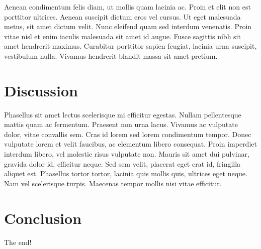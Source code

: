 \documentclass[11pt,twocolumn]{article} %
\begin{document}
Aenean condimentum felis diam, ut mollis quam lacinia ac. Proin et elit non est porttitor ultrices. Aenean suscipit dictum eros vel cursus. Ut eget malesuada metus, sit amet dictum velit. Nunc eleifend quam sed interdum venenatis. Proin vitae nisl et enim iaculis malesuada sit amet id augue. Fusce sagittis nibh sit amet hendrerit maximus. Curabitur porttitor sapien feugiat, lacinia urna suscipit, vestibulum nulla. Vivamus hendrerit blandit massa sit amet pretium.

\section{Discussion}

Phasellus sit amet lectus scelerisque mi efficitur egestas. Nullam pellentesque mattis quam ac fermentum. Praesent non urna lacus. Vivamus ac vulputate dolor, vitae convallis sem. Cras id lorem sed lorem condimentum tempor. Donec vulputate lorem et velit faucibus, ac elementum libero consequat. Proin imperdiet interdum libero, vel molestie risus vulputate non. Mauris sit amet dui pulvinar, gravida dolor id, efficitur neque. Sed sem velit, placerat eget erat id, fringilla aliquet est. Phasellus tortor tortor, lacinia quis mollis quis, ultrices eget neque. Nam vel scelerisque turpis. Maecenas tempor mollis nisi vitae efficitur.

\section{Conclusion}

The end!
\end{document}
